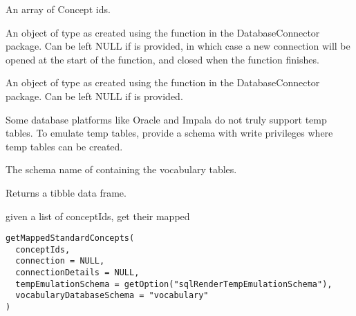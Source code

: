 \documentclass[a4paper]{book}
\begin{document}
\begin{Arguments}
\begin{ldescription}
\item[\code{conceptIds}] An array of Concept ids.

\item[\code{connection}] An object of type  as created using the
 function in the
DatabaseConnector package. Can be left NULL if 
is provided, in which case a new connection will be opened at the start
of the function, and closed when the function finishes.

\item[\code{connectionDetails}] An object of type  as created using the
 function in the
DatabaseConnector package. Can be left NULL if  is
provided.

\item[\code{tempEmulationSchema}] Some database platforms like Oracle and Impala do not truly support temp tables. To emulate temp 
tables, provide a schema with write privileges where temp tables can be created.

\item[\code{vocabularyDatabaseSchema}] The schema name of containing the vocabulary tables.
\end{ldescription}
\end{Arguments}
%
\begin{Value}
Returns a tibble data frame.
\end{Value}
%
\begin{Description}\relax
given a list of conceptIds, get their mapped
\end{Description}
%
\begin{Usage}
\begin{verbatim}
getMappedStandardConcepts(
  conceptIds,
  connection = NULL,
  connectionDetails = NULL,
  tempEmulationSchema = getOption("sqlRenderTempEmulationSchema"),
  vocabularyDatabaseSchema = "vocabulary"
)
\end{verbatim}
\end{Usage}
%
\end{document}
